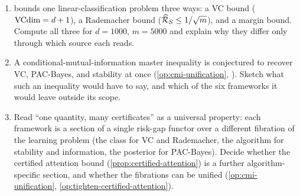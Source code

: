 \begin{enumerate}[leftmargin=*,itemsep=3pt]
\item {} bounds one linear-classification problem three ways: a VC bound ($\mathrm{VCdim}=d+1$), a Rademacher bound ($\widehat{\mathcal{R}}_S\le 1/\sqrt{m}$), and a margin bound.  Compute all three for $d=1000$, $m=5000$ and explain why they differ only through which source each reads.

\item A conditional-mutual-information master inequality is conjectured to recover VC, PAC-Bayes, and stability at once (\cref{op:cmi-unification}, \cite{SteinkeZakynthinou2020}).  Sketch what such an inequality would have to say, and which of the six frameworks it would leave outside its scope.

\item Read ``one quantity, many certificates'' as a universal property: each framework is a section of a single risk-gap functor over a different fibration of the learning problem (the class for VC and Rademacher, the algorithm for stability and information, the posterior for PAC-Bayes).  Decide whether the certified attention bound (\cref{prop:certified-attention}) is a further algorithm-specific section, and whether the fibrations can be unified (\cref{op:cmi-unification}, \cref{op:tighten-certified-attention}).
\end{enumerate}
